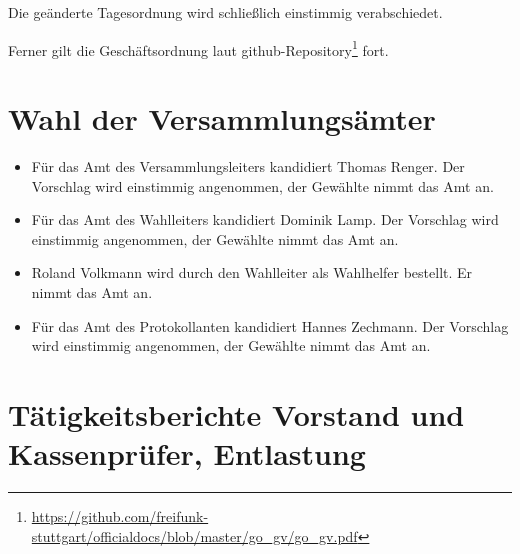 \documentclass[a4paper]{scrartcl}
\begin{document}
Die geänderte Tagesordnung wird schließlich einstimmig verabschiedet.

Ferner gilt die Geschäftsordnung laut github-Repository\footnote{\url{https://github.com/freifunk-stuttgart/officialdocs/blob/master/go_gv/go_gv.pdf}} fort.

\section{Wahl der Versammlungsämter}
\begin{itemize}
\item Für das Amt des Versammlungsleiters kandidiert Thomas Renger. Der Vorschlag wird einstimmig angenommen, der Gewählte nimmt das Amt an.
\item Für das Amt des Wahlleiters kandidiert Dominik Lamp. Der Vorschlag wird einstimmig angenommen, der Gewählte nimmt das Amt an.
\item Roland Volkmann wird durch den Wahlleiter als Wahlhelfer bestellt. Er nimmt das Amt an.
\item Für das Amt des Protokollanten kandidiert Hannes Zechmann. Der Vorschlag wird einstimmig angenommen, der Gewählte nimmt das Amt an.
\end{itemize}

\section{Tätigkeitsberichte Vorstand und Kassenprüfer, Entlastung}
\end{document}
